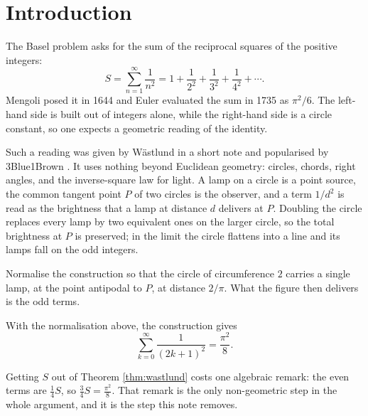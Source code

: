 \section{Introduction}

The Basel problem asks for the sum of the reciprocal squares of the positive integers:
\begin{equation}
  S=\sum_{n=1}^{\infty}\frac{1}{n^{2}}
   =1+\frac{1}{2^{2}}+\frac{1}{3^{2}}+\frac{1}{4^{2}}+\cdots .
  \label{eq:basel}
\end{equation}
Mengoli posed it in 1644 and Euler evaluated the sum in 1735 as $\pi^{2}/6$. The left-hand
side is built out of integers alone, while the right-hand side is a circle constant, so one
expects a geometric reading of the identity.

Such a reading was given by W\"astlund \cite{wastlund} in a short note and popularised by
3Blue1Brown \cite{threeblueonebrown}. It uses nothing beyond Euclidean geometry: circles,
chords, right angles, and the inverse-square law for light. A lamp on a circle is a point
source, the common tangent point $P$ of two circles is the observer, and a term $1/d^{2}$ is
read as the brightness that a lamp at distance $d$ delivers at $P$. Doubling the circle
replaces every lamp by two equivalent ones on the larger circle, so the total brightness at
$P$ is preserved; in the limit the circle flattens into a line and its lamps fall on the odd
integers.

Normalise the construction so that the circle of circumference $2$ carries a single lamp, at
the point antipodal to $P$, at distance $2/\pi$. What the figure then delivers is the odd
terms.

\begin{theorem}[W\"astlund]\label{thm:wastlund}
With the normalisation above, the construction gives
\begin{equation}
  \sum_{k=0}^{\infty}\frac{1}{(2k+1)^{2}}=\frac{\pi^{2}}{8}.
  \label{eq:odd-sum}
\end{equation}
\end{theorem}

Getting $S$ out of Theorem \ref{thm:wastlund} costs one algebraic remark: the even terms are
$\frac14 S$, so $\frac34 S=\frac{\pi^{2}}{8}$. That remark is the only non-geometric step in
the whole argument, and it is the step this note removes.

